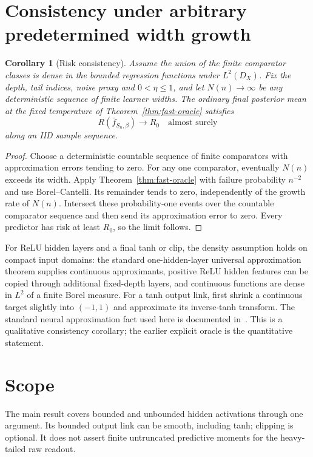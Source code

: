 \documentclass[11pt]{article}
\newtheorem{corollary}[theorem]{Corollary}\newtheorem{proposition}[theorem]{Proposition}
\theoremstyle{remark}\newtheorem{remark}[theorem]{Remark}
\begin{document}
\section{Consistency under arbitrary predetermined width growth}
\begin{corollary}[Risk consistency]\label{cor:consistency}
Assume the union of the finite comparator classes is dense in the bounded regression functions under $L^2(D_X)$. Fix the depth, tail indices, noise proxy and $0<\eta\le1$, and let $N(n)\to\infty$ be any deterministic sequence of finite learner widths. The ordinary final posterior mean at the fixed temperature of Theorem~\ref{thm:fast-oracle} satisfies
\[
 R(\bar f_{S_n,\beta})\longrightarrow R_0
 \quad\text{almost surely}
\]
along an IID sample sequence.
\end{corollary}
\begin{proof}
Choose a deterministic countable sequence of finite comparators with approximation errors tending to zero. For any one comparator, eventually $N(n)$ exceeds its width. Apply Theorem~\ref{thm:fast-oracle} with failure probability $n^{-2}$ and use Borel--Cantelli. Its remainder tends to zero, independently of the growth rate of $N(n)$. Intersect these probability-one events over the countable comparator sequence and then send its approximation error to zero. Every predictor has risk at least $R_0$, so the limit follows.
\end{proof}

For ReLU hidden layers and a final tanh or clip, the density assumption holds on compact input domains: the standard one-hidden-layer universal approximation theorem supplies continuous approximants, positive ReLU hidden features can be copied through additional fixed-depth layers, and continuous functions are dense in $L^2$ of a finite Borel measure. For a tanh output link, first shrink a continuous target slightly into $(-1,1)$ and approximate its inverse-tanh transform. The standard neural approximation fact used here is documented in~\cite{leshno}. This is a qualitative consistency corollary; the earlier explicit oracle is the quantitative statement.

\section{Scope}
The main result covers bounded and unbounded hidden activations through one argument. Its bounded output link can be smooth, including tanh; clipping is optional. It does not assert finite untruncated predictive moments for the heavy-tailed raw readout.
\end{document}
